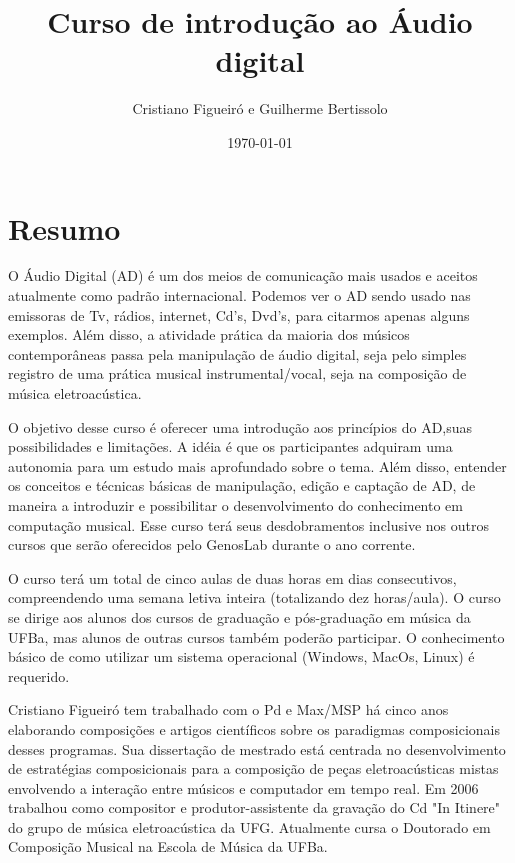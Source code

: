 \documentclass{article}
\title{Curso de introdução ao Áudio digital}
\author{Cristiano Figueiró e Guilherme Bertissolo}
\begin{document}
\date{\today}

\maketitle
\tableofcontents

\section{Resumo}

O Áudio Digital (AD) é um dos meios de comunicação mais usados e
aceitos atualmente como padrão internacional. Podemos ver o AD sendo
usado nas emissoras de Tv, rádios, internet, Cd's, Dvd's, para
citarmos apenas alguns exemplos. Além disso, a atividade prática da
maioria dos músicos contemporâneas passa pela manipulação de áudio
digital, seja pelo simples registro de uma prática musical
instrumental/vocal, seja na composição de música eletroacústica.
 
O objetivo desse curso é oferecer uma introdução aos princípios do
AD,suas possibilidades e limitações. A idéia é que os participantes
adquiram uma autonomia para um estudo mais aprofundado sobre o
tema. Além disso, entender os conceitos e técnicas básicas de
manipulação, edição e captação de AD, de maneira a introduzir e
possibilitar o desenvolvimento do conhecimento em computação
musical. Esse curso terá seus desdobramentos inclusive nos outros
cursos que serão oferecidos pelo GenosLab durante o ano corrente.

O curso terá um total de cinco aulas de duas horas em dias
consecutivos, compreendendo uma semana letiva inteira (totalizando dez
horas/aula). O curso se dirige aos alunos dos cursos de graduação e
pós-graduação em música da UFBa, mas alunos de outras cursos também
poderão participar. O conhecimento básico de como utilizar um sistema
operacional (Windows, MacOs, Linux) é requerido.

Cristiano Figueiró tem trabalhado com o Pd e Max/MSP há cinco anos
elaborando composições e artigos científicos sobre os paradigmas
composicionais desses programas. Sua dissertação de mestrado está
centrada no desenvolvimento de estratégias composicionais para a
composição de peças eletroacústicas mistas envolvendo a interação
entre músicos e computador em tempo real. Em 2006 trabalhou como
compositor e produtor-assistente da gravação do Cd "In Itinere" do
grupo de música eletroacústica da UFG. Atualmente cursa o Doutorado em
Composição Musical na Escola de Música da UFBa.
\end{document}
